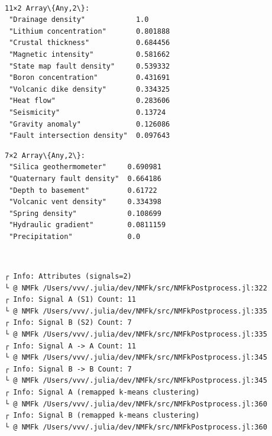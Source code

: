 \documentclass[11pt]{article}
\begin{document}
    \begin{Verbatim}[commandchars=\\\{\}]

    \end{Verbatim}

    \begin{center}
    \end{center}
    { \hspace*{\fill} \\}
    
    \begin{Verbatim}[commandchars=\\\{\}]

    \end{Verbatim}

    
    \begin{Verbatim}[commandchars=\\\{\}]
11×2 Array\{Any,2\}:
 "Drainage density"            1.0
 "Lithium concentration"       0.801888
 "Crustal thickness"           0.684456
 "Magnetic intensity"          0.581662
 "State map fault density"     0.539332
 "Boron concentration"         0.431691
 "Volcanic dike density"       0.334325
 "Heat flow"                   0.283606
 "Seismicity"                  0.13724
 "Gravity anomaly"             0.126086
 "Fault intersection density"  0.097643
    \end{Verbatim}

    
    
    \begin{Verbatim}[commandchars=\\\{\}]
7×2 Array\{Any,2\}:
 "Silica geothermometer"     0.690981
 "Quaternary fault density"  0.664186
 "Depth to basement"         0.61722
 "Volcanic vent density"     0.334398
 "Spring density"            0.108699
 "Hydraulic gradient"        0.0811159
 "Precipitation"             0.0
    \end{Verbatim}

    
    \begin{center}
    \end{center}
    { \hspace*{\fill} \\}
    
    \begin{Verbatim}[commandchars=\\\{\}]
┌ Info: Attributes (signals=2)
└ @ NMFk /Users/vvv/.julia/dev/NMFk/src/NMFkPostprocess.jl:322
┌ Info: Signal A (S1) Count: 11
└ @ NMFk /Users/vvv/.julia/dev/NMFk/src/NMFkPostprocess.jl:335
┌ Info: Signal B (S2) Count: 7
└ @ NMFk /Users/vvv/.julia/dev/NMFk/src/NMFkPostprocess.jl:335
┌ Info: Signal A -> A Count: 11
└ @ NMFk /Users/vvv/.julia/dev/NMFk/src/NMFkPostprocess.jl:345
┌ Info: Signal B -> B Count: 7
└ @ NMFk /Users/vvv/.julia/dev/NMFk/src/NMFkPostprocess.jl:345
┌ Info: Signal A (remapped k-means clustering)
└ @ NMFk /Users/vvv/.julia/dev/NMFk/src/NMFkPostprocess.jl:360
┌ Info: Signal B (remapped k-means clustering)
└ @ NMFk /Users/vvv/.julia/dev/NMFk/src/NMFkPostprocess.jl:360
    \end{Verbatim}
\end{document}
